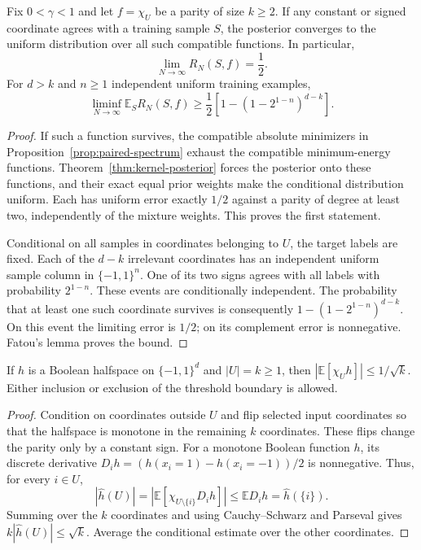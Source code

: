 \begin{corollary}
\label{cor:surviving-coordinates}
Fix $0<\gamma<1$ and let $f=\chi_U$ be a parity of size $k\ge2$.
If any constant or signed coordinate agrees with a training sample
$S$, the posterior converges to the uniform distribution over all
such compatible functions. In particular,
\[
 \lim_{N\to\infty}R_N(S,f)=\frac12.
\]
For $d>k$ and $n\ge1$ independent uniform training examples,
\begin{equation}\label{eq:coordinate-sample-bound}
 \liminf_{N\to\infty}\mathbb E_S R_N(S,f)
 \ge\frac12\left[1-\left(1-2^{1-n}\right)^{d-k}\right].
\end{equation}
\end{corollary}

\begin{proof}
If such a function survives, the compatible absolute minimizers in
Proposition~\ref{prop:paired-spectrum} exhaust the compatible
minimum-energy functions. Theorem~\ref{thm:kernel-posterior} forces
the posterior onto these functions, and their exact equal prior
weights make the conditional distribution uniform. Each has uniform error exactly
$1/2$ against a parity of degree at least two, independently of
the mixture weights. This proves the first statement.

Conditional on all samples in coordinates belonging to $U$, the
target labels are fixed. Each of the $d-k$ irrelevant coordinates
has an independent uniform sample column in $\{-1,1\}^n$. One of
its two signs agrees with all labels with probability $2^{1-n}$.
These events are conditionally independent. The probability that
at least one such coordinate survives is consequently
$1-(1-2^{1-n})^{d-k}$. On this event the limiting error is $1/2$;
on its complement error is nonnegative. Fatou's lemma proves the
bound.
\end{proof}

\begin{lemma}
\label{lem:halfspace-parity}
If $h$ is a Boolean halfspace on $\{-1,1\}^d$ and $|U|=k\ge1$, then
$|\mathbb E[\chi_U h]|\le1/\sqrt{k}$. Either inclusion or exclusion
of the threshold boundary is allowed.
\end{lemma}

\begin{proof}
Condition on coordinates outside $U$ and flip selected input
coordinates so that the halfspace is monotone in the remaining $k$
coordinates. These flips change the parity only by a constant sign.
For a monotone Boolean function $h$, its discrete derivative
$D_i h=(h(x_i=1)-h(x_i=-1))/2$ is nonnegative. Thus, for every
$i\in U$,
\[
 |\widehat h(U)|
 =|\mathbb E[\chi_{U\setminus\{i\}}D_ih]|
 \le\mathbb E D_i h=\widehat h(\{i\}).
\]
Summing over the $k$ coordinates and using Cauchy--Schwarz and
Parseval gives $k|\widehat h(U)|\le\sqrt{k}$.
Average the conditional estimate over the other coordinates.
\end{proof}


